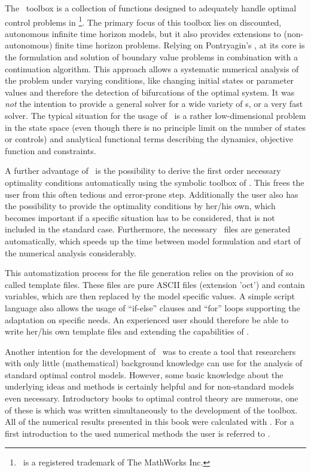 
The \OCT\ toolbox is a collection of functions designed to adequately handle optimal control problems in \MATL\TReg\footnote{\MATL\ is a registered trademark of The MathWorks Inc.}. The primary focus of this toolbox lies on discounted, autonomous infinite time horizon models, but it also provides extensions to (non-autonomous) finite time horizon problems. Relying on Pontryagin's \MAXP, at its core is the formulation and solution of boundary value problems in combination with a continuation algorithm. This approach allows a systematic numerical analysis of the problem under varying conditions, like changing initial states or parameter values and therefore the detection of bifurcations of the optimal system. It was \emph{not} the intention to provide a general solver for a wide variety of \OCPRO s, or a very fast solver. The typical situation for the usage of \OCMAT\ is a rather low-dimensional problem in the state space (even though there is no principle limit on the number of states or controls) and analytical functional terms describing the dynamics, objective function and constraints.  

A further advantage of \OCMAT\ is the possibility to derive the first order necessary optimality conditions automatically using the symbolic toolbox of \MATL. This frees the user from this often tedious and error-prone step. Additionally the user also has the possibility to provide the optimality conditions by her/his own, which becomes important if a specific situation has to be considered, that is not included in the standard case. Furthermore, the necessary \MATL\ files are generated automatically, which speeds up the time between model formulation and start of the numerical analysis considerably. 

This automatization process for the file generation relies on the provision of so called template files. These files are pure ASCII files (extension 'oct') and contain variables, which are then replaced by the model specific values. A simple script language also allows the usage of ``if-else'' clauses and ``for'' loops supporting the adaptation on specific needs. An experienced user should therefore be able to write her/his own template files and extending the capabilities of \OCMAT.

Another intention for the development of \OCMAT\ was to create a tool that researchers with only little (mathematical) background knowledge can use for the analysis of standard optimal control models. However, some basic knowledge about the underlying ideas and methods is certainly helpful and for non-standard models even necessary. Introductory books to optimal control theory are numerous, one of these is \cite{grassetal2008} which was written simultaneously to the development of the toolbox. All of the numerical results presented in this book were calculated with \OCMAT. For a first introduction to the used numerical methods the user is referred to \citet{grass2012}. 

